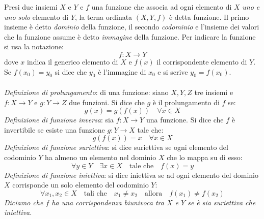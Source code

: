     Presi due insiemi $X$ e $Y$ e $f$ una funzione che associa ad ogni elemento 
    di $X$ \emph{uno e uno solo} elemento di $Y$, la terna ordinata $(X,Y,f)$ è detta funzione.
    Il primo insieme è detto \emph{dominio} della funzione, il secondo \emph{codominio} e 
    l'insieme dei valori che la funzione assume è detto \emph{immagine} della funzione. Per indicare la funzione si usa la notazione:
        \begin{equation}
            f: X \to Y
        \end{equation}
        dove $x$ indica il generico elemento di $X$ e $f(x)$ il corrispondente elemento di $Y$.
        Se $f(x_0)=y_0$ si dice che $y_0$ è l'immagine di $x_0$ e si scrive $y_0=f(x_0)$. 
        \\\\ \emph{Definizione di prolungamento}: di una funzione: siano $X,Y,Z$ tre insiemi e $f: X \to Y$ e $g: Y \to Z$ due funzioni. Si dice che $g$ è il prolungamento di $f$ se:
        \begin{equation}
            g(x)=g(f(x)) \quad \forall x \in X
        \end{equation}
        \emph{Definizione di funzione inversa}: sia $f: X \to Y$ una funzione. Si dice che $f$ è invertibile se esiste una funzione $g: Y \to X$ tale che:
        \begin{equation}
            g(f(x))=x \quad \forall x \in X
        \end{equation}
    \emph{Definizione di funzione suriettiva}: si dice suriettiva se ogni elemento del codominio $Y$ ha almeno un elemento nel dominio $X$ che lo mappa su di esso:
        \begin{equation}
            \forall y \in Y \quad \exists x \in X \quad \text{tale che} \quad f(x)=y
        \end{equation}  
    \emph{Definizione di funzione iniettiva}: si dice iniettiva se ad ogni elemento del dominio $X$ corrisponde un solo elemento del codominio $Y$:
        \begin{equation}
            \forall x_1,x_2 \in X \quad \text{tali che} \quad x_1 \neq x_2 \quad \text{allora} \quad f(x_1) \neq f(x_2)
        \end{equation}
\emph{Diciamo che $f$ ha una corrispondenza biunivoca tra $X$ e $Y$ se è sia suriettiva che iniettiva.}

